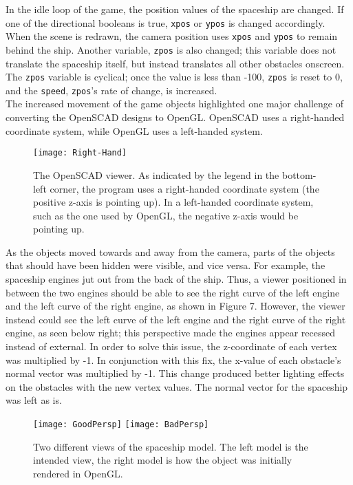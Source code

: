 \documentclass[12pt]{article}
\begin{document}
\begin{doublespace}
In the idle loop of the game, the position values of the spaceship are changed. If one of the directional booleans is true, \texttt{xpos} or \texttt{ypos} is changed accordingly. When the scene is redrawn, the camera position uses \texttt{xpos} and \texttt{ypos} to remain behind the ship. Another variable, \texttt{zpos} is also changed; this variable does not translate the spaceship itself, but instead translates all other obstacles onscreen. The \texttt{zpos} variable is cyclical; once the value is less than -100, \texttt{zpos} is reset to 0, and the \texttt{speed}, \texttt{zpos}'s rate of change, is increased.\\

The increased movement of the game objects highlighted one major challenge of converting the OpenSCAD designs to OpenGL. OpenSCAD uses a right-handed coordinate system, while OpenGL uses a left-handed system.
\begin{figure}[h]
  \texttt{[image: Right-Hand]}
  \centering
  \caption{The OpenSCAD viewer. As indicated by the legend in the bottom-left corner, the program uses a right-handed coordinate system (the positive z-axis is pointing up). In a left-handed coordinate system, such as the one used by OpenGL, the negative z-axis would be pointing up.}
\end{figure}
As the objects moved towards and away from the camera, parts of the objects that should have been hidden were visible, and vice versa. For example, the spaceship engines jut out from the back of the ship. Thus, a viewer positioned in between the two engines should be able to see the right curve of the left engine and the left curve of the right engine, as shown in Figure 7. However, the viewer instead could see the left curve of the left engine and the right curve of the right engine, as seen below right; this perspective made the engines appear recessed instead of external. In order to solve this issue, the z-coordinate of each vertex was multiplied by -1. In conjunction with this fix, the x-value of each obstacle's normal vector was multiplied by -1. This change produced better lighting effects on the obstacles with the new vertex values. The normal vector for the spaceship was left as is.
\begin{figure}[h]
  \texttt{[image: GoodPersp]}
  \texttt{[image: BadPersp]}
  \centering
  \caption{Two different views of the spaceship model. The left model is the intended view, the right model is how the object was initially rendered in OpenGL.}
\end{figure}


\end{doublespace}
\end{document}
